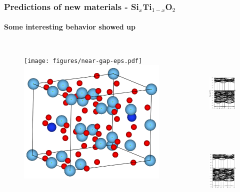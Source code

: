 \documentclass{beamer}
\begin{document}
\begin{frame}
    \frametitle{Predictions of new materials - Si$_x$Ti$_{1-x}$O$_2$}
    \framesubtitle{Some interesting behavior showed up}

	\begin{columns}[c]

    \begin{figure}
	\texttt{[image: figures/near-gap-eps.pdf]}
	\newline
	\includegraphics[width=0.9\linewidth]{figures/cell.jpg}
	\end{figure}


    \begin{figure}
	\includegraphics[height=4cm]{figures/spaghettiOSi.pdf}
	\includegraphics[height=4cm]{figures/spaghettinotOSi.pdf}
	\end{figure}

    \end{columns}

\end{frame}
\end{document}
